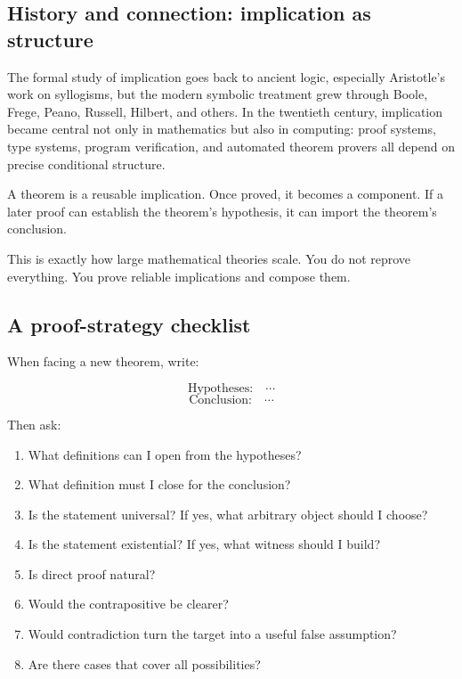 \subsection{History and connection: implication as structure}

\begin{historybox}
The formal study of implication goes back to ancient logic, especially Aristotle's work on syllogisms, but the modern symbolic treatment grew through Boole, Frege, Peano, Russell, Hilbert, and others. In the twentieth century, implication became central not only in mathematics but also in computing: proof systems, type systems, program verification, and automated theorem provers all depend on precise conditional structure.
\end{historybox}

A theorem is a reusable implication. Once proved, it becomes a component. If a later proof can establish the theorem's hypothesis, it can import the theorem's conclusion.

This is exactly how large mathematical theories scale. You do not reprove everything. You prove reliable implications and compose them.

\subsection{A proof-strategy checklist}

When facing a new theorem, write:

\[
\text{Hypotheses:}\quad \cdots
\]
\[
\text{Conclusion:}\quad \cdots
\]

Then ask:

\begin{enumerate}
\item What definitions can I open from the hypotheses?
\item What definition must I close for the conclusion?
\item Is the statement universal? If yes, what arbitrary object should I choose?
\item Is the statement existential? If yes, what witness should I build?
\item Is direct proof natural?
\item Would the contrapositive be clearer?
\item Would contradiction turn the target into a useful false assumption?
\item Are there cases that cover all possibilities?
\end{enumerate}


